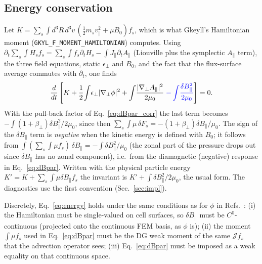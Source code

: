 \documentclass[11pt, letterpaper]{article}
\newcommand{\dBpar}{\delta B_\parallel}
\newcommand{\vpar}{v_\parallel}
\newcommand{\Apar}{A_\parallel}
\newcommand{\code}[1]{\texttt{#1}}
\newcommand{\new}[1]{\textcolor{blue}{#1}}
\begin{document}
\subsection{Energy conservation}
\label{sec:energy}
Let $K = \sum_s\int d^3\!R\,d^3v\,(\tfrac12 m_s\vpar^2 + \mu B_0) f_s$, which is what Gkeyll's
Hamiltonian moment (\code{GKYL\_F\_MOMENT\_HAMILTONIAN}) computes. Using
$\partial_t\sum_s\!\int H_s f_s = \sum_s\!\int f_s\partial_t H_s - \int J_\parallel\partial_t\Apar$
(Liouville plus the symplectic $\Apar$ term), the three field equations, static
$\epsilon_\perp$ and $B_0$, and the fact that the flux-surface average commutes with $\partial_t$,
one finds
\begin{equation}
  \frac{d}{dt}\left[
    K + \frac12\!\int\!\epsilon_\perp|\nabla_\perp\phi|^2
      + \int\!\frac{|\nabla_\perp\Apar|^2}{2\mu_0}
      \;\new{-\int\!\frac{\dBpar^2}{2\mu_0}}
  \right] = 0 .
  \label{eq:energy}
\end{equation}
With the pull-back factor of Eq.~\eqref{eq:dBpar_corr} the last term becomes
$-\int(1+\beta_\perp)\dBpar^2/2\mu_0$, since then $\sum_s\!\int\mu\,\delta F_s = -(1+\beta_\perp)\dBpar/\mu_0$.
The sign of the $\dBpar$ term is \emph{negative} when the kinetic energy is defined with $B_0$;
it follows from $\int(\sum_s\!\int\mu f_s)\,\dBpar = -\int\dBpar^2/\mu_0$ (the zonal part of the
pressure drops out since $\dBpar$ has no zonal component), i.e.\ from the diamagnetic (negative)
response in Eq.~\eqref{eq:dBpar}. Written with the physical particle energy
$K' = K + \sum_s\int\mu\dBpar f_s$ the invariant is $K' + \int\dBpar^2/2\mu_0$, the usual form.
The diagnostics use the first convention (Sec.~\ref{sec:impl}).

Discretely, Eq.~\eqref{eq:energy} holds under the same conditions as for $\phi$ in
Refs.~\cite{Hakim2020,Mandell2020}: (i) the Hamiltonian must be single-valued on cell surfaces,
so $\dBpar$ must be $C^0$-continuous (projected onto the continuous FEM basis, as $\phi$ is);
(ii) the moment $\int\mu f_s$ used in Eq.~\eqref{eq:dBpar} must be the DG weak moment of the same
$\mathcal{J}f_s$ that the advection operator sees; (iii) Eq.~\eqref{eq:dBpar} must be imposed as a
weak equality on that continuous space.
\end{document}
